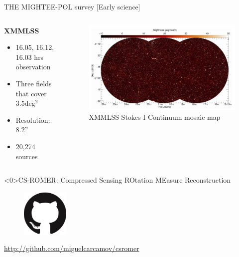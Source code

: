 \documentclass[xetex,aspectratio=169]{beamer}
\begin{document}
\begin{frame}{THE MIGHTEE-POL survey [Early science]}
	\begin{columns}[onlytextwidth,t]
		\begin{column}{.5\textwidth}
			\textbf{XMMLSS}
			\begin{itemize}
				\item 16.05, 16.12, 16.03 hrs observation
				\item Three fields that cover 3.5\;deg$^{2}$
				\item Resolution: 8.2''
				\item 20,274 sources
			\end{itemize}

		\end{column}

		\begin{column}{.5\textwidth}
			\begin{figure}
				\centering
				\includegraphics[scale=0.3]{figures/mightee_survey/xmmlss.png}
				\caption*{XMMLSS Stokes I Continuum mosaic map ~\parencite{mightee-pol}}
				\label{fig:xmmlss}
			\end{figure}
		\end{column}

	\end{columns}
\end{frame}


\begin{frame}<0>{CS-ROMER: Compressed Sensing ROtation MEasure Reconstruction}
	\begin{figure}
		\centering
		\includegraphics[width=0.2\textwidth]{figures/logos/GitHub-Mark-120px-plus.png}
	\end{figure}

	\begin{center}
		\url{http://github.com/miguelcarcamov/csromer}
	\end{center}


\end{frame}
\end{document}
